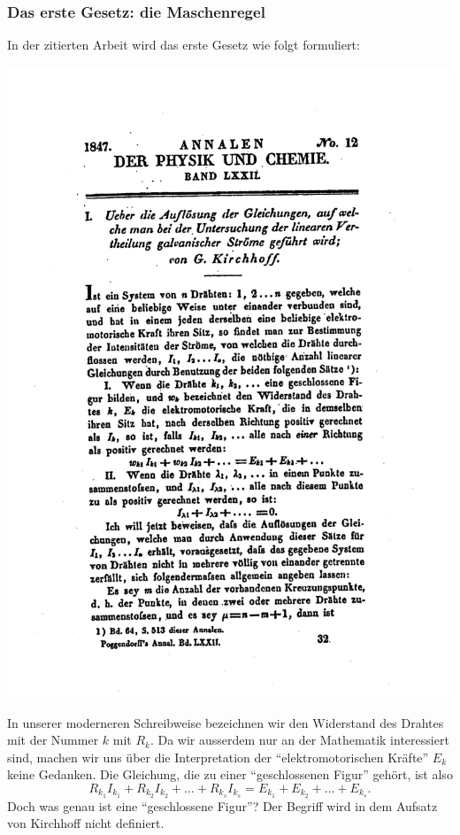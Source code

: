 \subsubsection{Das erste Gesetz: die Maschenregel}
In der zitierten Arbeit wird das erste Gesetz wie folgt formuliert:
\bigskip
\begin{center}
\includegraphics[width=0.7\hsize]{graphics/kh1}
\end{center}
\bigskip
In unserer moderneren Schreibweise bezeichnen wir den Widerstand des
Drahtes mit der Nummer $k$ mit $R_k$. Da wir ausserdem nur an der
Mathematik interessiert sind, machen wir uns über die Interpretation
der ``elektromotorischen Kräfte'' $E_k$ keine Gedanken. Die Gleichung,
die zu einer ``geschlossenen Figur'' gehört, ist also
\[
R_{k_1}I_{k_1}+
R_{k_2}I_{k_2}+
\dots + R_{k_s}I_{k_s}=
E_{k_1}+E_{k_2}+\dots+E_{k_s}.
\]
Doch was genau ist eine ``geschlossene Figur''? Der Begriff wird
in dem Aufsatz von Kirchhoff nicht definiert.

